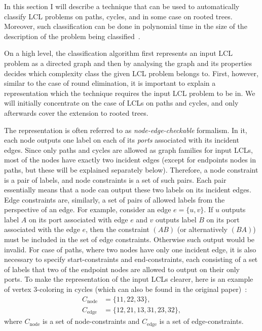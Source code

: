 In this section I will describe a technique that can be used to automatically
classify LCL problems on paths, cycles, and in some case on rooted trees.
Moreover, such classification can be done in polynomial time in the size
of the description of the problem being classified~\cite{Chang2020}.

On a high level, the classification algorithm first represents an input LCL problem as
a directed graph and then by analysing the graph and its properties decides
which complexity class the given LCL problem belongs to. First, however, similar to
the case of round elimination, it is important to explain a representation which
the technique requires the input LCL problem to be in. We will initially concentrate on the case
of LCLs on paths and cycles, and only afterwards cover the extension to rooted trees.

The representation is often referred to as \emph{node-edge-checkable} formalism.
In it, each node outputs one label on each of its \emph{ports} associated with
its incident edges. Since only paths and cycles are allowed as graph families for
input LCLs, most of the nodes have exactly two incident edges (except for endpoints nodes
in paths, but these will be explained separately below). Therefore, a node constraint
is a pair of labels, and node constraints is a set of such pairs. Each pair essentially
means that a node can output these two labels on its incident edges. Edge constraints are,
similarly, a set of pairs of allowed labels from the perspective of an edge. For example,
consider an edge $e = \{u, v\}$. If $u$ outputs label $A$ on its port associated with edge $e$
and $v$ outputs label $B$ on its port associated with the edge $e$, then the constraint $(AB)$
(or alternatively $(BA)$) must be included in the set of edge constraints. Otherwise such output
would be invalid. For case of paths, where two nodes have only one incident edge, it is also
necessary to specify start-constraints and end-constraints, each consisting of a set of labels
that two of the endpoint nodes are allowed to output on their only ports. To make the
representation of the input LCLs clearer, here is an example of vertex 3-coloring in cycles
(which can also be found in the original paper)~\cite{Chang2020}:
\begin{align*}
  C_{\textrm{node}} &= \{ 11, 22, 33 \}, \\
  C_{\textrm{edge}} &= \{ 12, 21, 13, 31, 23, 32 \},
\end{align*}
where $C_{\textrm{node}}$ is a set of node-constraints and $C_{\textrm{edge}}$ is a set of edge-constraints.

